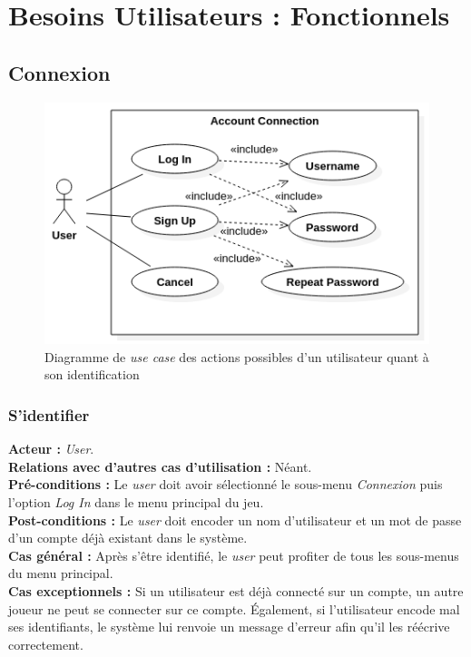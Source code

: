\documentclass[10pt, a4paper]{article}
\begin{document}

\section{Besoins Utilisateurs : Fonctionnels}


\subsection{Connexion}

\begin{figure}[H]
\centering
\includegraphics[scale=0.5]{ConnectionUseCase.png}
\caption{Diagramme de \textit{use case} des actions possibles d'un utilisateur quant à son identification}
\label{UC_co} %
\end{figure}

\subsubsection{S'identifier}
\textbf{Acteur :} \textit{User}.\\
\textbf{Relations avec d'autres cas d'utilisation :} Néant.\\
\textbf{Pré-conditions :} Le \textit{user} doit avoir sélectionné le sous-menu \textit{Connexion} puis l'option {\itshape Log In} dans le menu principal du jeu.\\
\textbf{Post-conditions :} Le \textit{user} doit encoder un nom d'utilisateur et un mot de passe d'un compte déjà existant dans le système. \\
\textbf{Cas général :} Après s'être identifié, le \textit{user} peut profiter de tous les sous-menus du menu principal.\\
\textbf{Cas exceptionnels :} Si un utilisateur est déjà connecté sur un compte, un autre joueur ne peut se connecter sur ce compte. Également, si l'utilisateur encode mal ses identifiants, le système lui renvoie un message d'erreur afin qu'il les réécrive correctement.
\end{document}
